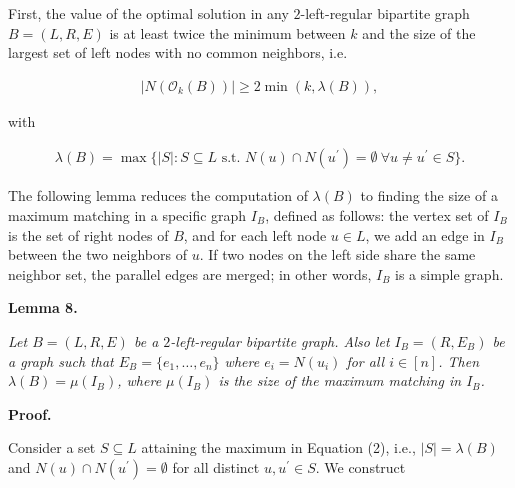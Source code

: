 \documentclass[10pt,a4paper]{article}
\begin{document}
First, the value of the optimal solution in any $2$-left-regular bipartite graph $B=(L,R,E)$ is at least twice the minimum between $k$ and the size of the largest set of left nodes with no common neighbors, i.e.\par


\[\begin{gathered}
\displaystyle|N(\mathcal{O}_{k}(B))|\geq 2\min\left(k,\lambda(B)\right),
\end{gathered}\]


with\par


\[\begin{gathered}
\displaystyle\lambda(B)=\max\{|S|:S\subseteq L\text{ s.t. }N(u)\cap N(u^{\prime})=\emptyset\ \forall u\neq u^{\prime}\in S\}.
\end{gathered}\]




The following lemma reduces the computation of $\lambda(B)$ to finding the size of a maximum matching in a specific graph $I_{B}$, defined as follows: the vertex set of $I_{B}$ is the set of right nodes of $B$, and for each left node $u\in L$, we add an edge in $I_{B}$ between the two neighbors of $u$. If two nodes on the left side share the same neighbor set, the parallel edges are merged; in other words, $I_{B}$ is a simple graph.\par





\par\medskip\noindent\textbf{\textbf{Lemma 8}\textbf{.}}\par



\emph{Let $B=(L,R,E)$ be a $2$-left-regular bipartite graph.
Also let $I_{B}=(R,E_{B})$ be a graph such that $E_{B}=\{e_{1},\dots,e_{n}\}$ where $e_{i}=N(u_{i})$ for all $i\in[n]$.
Then $\lambda(B)=\mu(I_{B})$, where $\mu(I_{B})$ is the size of the maximum matching in $I_{B}$.}\par






\par\medskip\noindent\textbf{Proof.}\par



Consider a set $S\subseteq L$ attaining the maximum in Equation (2), i.e., $|S|=\lambda(B)$ and
$N(u)\cap N(u^{\prime})=\emptyset$ for all distinct $u,u^{\prime}\in S$.
We construct\par
\end{document}
